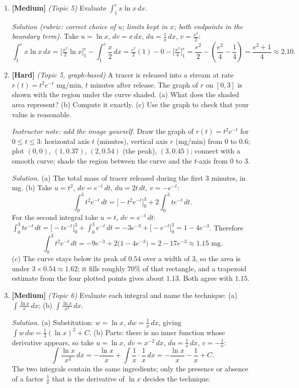 \documentclass[11pt]{article}
\begin{document}
\begin{enumerate}
\item \textbf{[Medium]} \emph{(Topic 5)} Evaluate $\displaystyle\int_1^e x\ln x\,dx$.

\textit{Solution (rubric: correct choice of $u$; limits kept in $x$; both endpoints in the boundary term).} Take $u=\ln x$, $dv=x\,dx$, $du=\frac1x\,dx$, $v=\frac{x^2}{2}$:
\[ \int_1^ex\ln x\,dx = \Big[\tfrac{x^2}{2}\ln x\Big]_1^e - \int_1^e\frac{x}{2}\,dx = \tfrac{e^2}{2}(1) - 0 - \Big[\tfrac{x^2}{4}\Big]_1^e = \frac{e^2}{2} - \left(\frac{e^2}{4}-\frac14\right) = \frac{e^2+1}{4}\approx2.10. \]

\item \textbf{[Hard]} \emph{(Topic 5, graph-based)} A tracer is released into a stream at rate $r(t)=t^2e^{-t}$ mg/min, $t$ minutes after release. The graph of $r$ on $[0,3]$ is shown with the region under the curve shaded. (a) What does the shaded area represent? (b) Compute it exactly. (c) Use the graph to check that your value is reasonable.

\textit{Instructor note: add the image yourself.} Draw the graph of $r(t)=t^2e^{-t}$ for $0\le t\le3$: horizontal axis $t$ (minutes), vertical axis $r$ (mg/min) from $0$ to $0.6$; plot $(0,0)$, $(1,0.37)$, $(2,0.54)$ (the peak), $(3,0.45)$; connect with a smooth curve; shade the region between the curve and the $t$-axis from $0$ to $3$.

\textit{Solution.} (a) The total mass of tracer released during the first 3 minutes, in mg. (b) Take $u=t^2$, $dv=e^{-t}\,dt$, $du=2t\,dt$, $v=-e^{-t}$:
\[ \int_0^3t^2e^{-t}\,dt = \big[-t^2e^{-t}\big]_0^3 + 2\int_0^3te^{-t}\,dt. \]
For the second integral take $u=t$, $dv=e^{-t}\,dt$: $\int_0^3te^{-t}\,dt = \big[-te^{-t}\big]_0^3+\int_0^3e^{-t}\,dt = -3e^{-3} + \big[-e^{-t}\big]_0^3 = 1-4e^{-3}$. Therefore
\[ \int_0^3t^2e^{-t}\,dt = -9e^{-3} + 2\big(1-4e^{-3}\big) = 2 - 17e^{-3}\approx 1.15\text{ mg}. \]
(c) The curve stays below its peak of $0.54$ over a width of $3$, so the area is under $3\times0.54\approx1.62$; it fills roughly $70\%$ of that rectangle, and a trapezoid estimate from the four plotted points gives about $1.13$. Both agree with $1.15$.

\item \textbf{[Medium]} \emph{(Topic 6)} Evaluate each integral and name the technique: (a) $\displaystyle\int\frac{\ln x}{x}\,dx$; (b) $\displaystyle\int\frac{\ln x}{x^2}\,dx$.

\textit{Solution.} (a) Substitution: $w=\ln x$, $dw=\frac1x\,dx$, giving $\int w\,dw=\frac12(\ln x)^2+C$. (b) Parts: there is no inner function whose derivative appears, so take $u=\ln x$, $dv=x^{-2}\,dx$, $du=\frac1x\,dx$, $v=-\frac1x$:
\[ \int\frac{\ln x}{x^2}\,dx = -\frac{\ln x}{x} + \int\frac{1}{x}\cdot\frac{1}{x}\,dx = -\frac{\ln x}{x} - \frac1x + C. \]
The two integrals contain the same ingredients; only the presence or absence of a factor $\frac1x$ that is the derivative of $\ln x$ decides the technique.


\end{enumerate}
\end{document}
